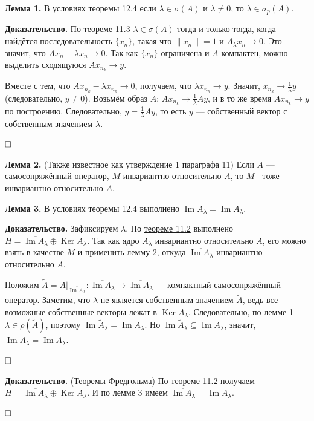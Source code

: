 \documentclass[12pt, a4paper]{article}
\DeclareMathOperator{\im}{Im}
\DeclareMathOperator{\Ker}{Ker}
\newcommand{\QED}{$\hfill\square$}
\renewcommand{\subset}{\subseteq}   %
\begin{document}
\textbf{Лемма 1.} В условиях теоремы 12.4 если $\lambda \in \sigma(A)$ и $\lambda \ne 0$, то $\lambda \in \sigma_p(A)$.

\textbf{Доказательство.} По \hyperref[th:11-3]{теореме 11.3} $\lambda \in \sigma(A)$ тогда и только тогда, когда найдётся последовательность $\{x_n\}$, такая что $\|x_n\| = 1$ и $A_\lambda x_n \to 0$.
Это значит, что $Ax_n - \lambda x_n \to 0$.
Так как $\{x_n\}$ ограничена и $A$ компактен, можно выделить сходящуюся $A x_{n_k} \to y$.

Вместе с тем, что $Ax_{n_k} - \lambda x_{n_k} \to 0$, получаем, что $\lambda x_{n_k} \to y$.
Значит, $x_{n_k} \to \frac{1}{\lambda} y$ (следовательно, $y \neq 0$).
Возьмём образ $A$: $Ax_{n_k} \to \frac{1}{\lambda} A y$, и в то же время $Ax_{n_k} \to y$ по построению.
Следовательно, $y = \frac{1}{\lambda} Ay$, то есть $y$ --- собственный вектор с собственным значением $\lambda$.

\QED

\textbf{Лемма 2.}  \label{l:12.2} (Также известное как утверждение 1 параграфа 11) Если $A$ --- самосопряжённый оператор, $M$ инвариантно относительно $A$, то $M^\bot$ тоже инвариантно относительно $A$.

\textbf{Лемма 3.} В условиях теоремы 12.4 выполнено $\overline{\im A_\lambda} = \im A_\lambda$.

\textbf{Доказательство.} Зафиксируем $\lambda$.
По \hyperref[th:11-2]{теореме 11.2} выполнено $H = \overline{\im A_\lambda} \oplus \Ker A_\lambda$.
Так как ядро $A_\lambda$ инвариантно относительно $A$, его можно взять в качестве $M$ и применить лемму 2, откуда $\overline{\im A_\lambda}$ инвариантно относительно $A$.

Положим $\tilde A = A|_{\overline{\im A_\lambda}}: \overline{\im A_\lambda} \to \overline{\im A_\lambda}$ --- компактный самосопряжённый оператор.
Заметим, что $\lambda$ не является собственным значением $\tilde A$, ведь все возможные собственные векторы лежат в $\Ker A_\lambda$.
Следовательно, по лемме 1 $\lambda \in \rho(\tilde A)$, поэтому $\im \tilde A_\lambda = \overline{\im A_\lambda}$. Но $\im \tilde A_\lambda \subset \im A_\lambda$, значит, $\overline{\im A_\lambda} = \im A_\lambda$.

\QED

\textbf{Доказательство.} (Теоремы Фредгольма) По \hyperref[th:11-2]{теореме 11.2} получаем $H = \overline{\im A_\lambda} \oplus \Ker A_\lambda$.
И по лемме 3 имеем $\overline{\im A_\lambda} = \im A_\lambda$.

\QED
\end{document}
